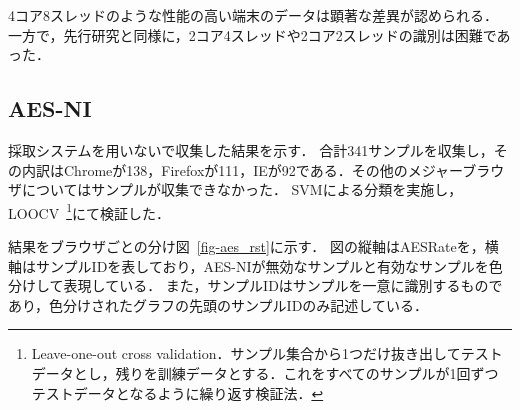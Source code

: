 4コア8スレッドのような性能の高い端末のデータは顕著な差異が認められる．
一方で，先行研究と同様に，2コア4スレッドや2コア2スレッドの識別は困難であった．

\subsection{AES-NI}
採取システムを用いないで収集した結果を示す．
合計341サンプルを収集し，その内訳はChromeが138，Firefoxが111，IEが92である．その他のメジャーブラウザについてはサンプルが収集できなかった．
SVMによる分類を実施し，LOOCV~\footnote{Leave-one-out cross validation．サンプル集合から1つだけ抜き出してテストデータとし，残りを訓練データとする．これをすべてのサンプルが1回ずつテストデータとなるように繰り返す検証法．}にて検証した．

結果をブラウザごとの分け図~\ref{fig-aes_rst}に示す．
図の縦軸はAESRateを，横軸はサンプルIDを表しており，AES-NIが無効なサンプルと有効なサンプルを色分けして表現している．
また，サンプルIDはサンプルを一意に識別するものであり，色分けされたグラフの先頭のサンプルIDのみ記述している．

